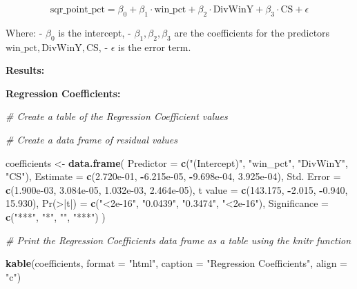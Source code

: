\documentclass[
]{article}
\newenvironment{Shaded}{\begin{snugshade}}{\end{snugshade}}
\newcommand{\AttributeTok}[1]{\textcolor[rgb]{0.13,0.29,0.53}{#1}}
\newcommand{\CommentTok}[1]{\textcolor[rgb]{0.56,0.35,0.01}{\textit{#1}}}
\newcommand{\FloatTok}[1]{\textcolor[rgb]{0.00,0.00,0.81}{#1}}
\newcommand{\FunctionTok}[1]{\textcolor[rgb]{0.13,0.29,0.53}{\textbf{#1}}}
\newcommand{\NormalTok}[1]{#1}
\newcommand{\OtherTok}[1]{\textcolor[rgb]{0.56,0.35,0.01}{#1}}
\newcommand{\SpecialCharTok}[1]{\textcolor[rgb]{0.81,0.36,0.00}{\textbf{#1}}}
\newcommand{\StringTok}[1]{\textcolor[rgb]{0.31,0.60,0.02}{#1}}
\begin{document}
\[
\text{sqr\_point\_pct} = \beta_0 + \beta_1 \cdot \text{win\_pct} + \beta_2 \cdot \text{DivWinY} + \beta_3 \cdot \text{CS} + \epsilon
\]

Where: - \(\beta_0\) is the intercept, - \(\beta_1, \beta_2, \beta_3\)
are the coefficients for the predictors
\(\text{win\_pct}, \text{DivWinY}, \text{CS}\), - \(\epsilon\) is the
error term.

\textbf{Results:}

\textbf{Regression Coefficients:}

\begin{Shaded}
\begin{Highlighting}[]
\CommentTok{\# Create a table of the Regression Coefficient values}

\CommentTok{\# Create a data frame of residual values}

\NormalTok{coefficients }\OtherTok{\textless{}{-}} \FunctionTok{data.frame}\NormalTok{(}
  \AttributeTok{Predictor =} \FunctionTok{c}\NormalTok{(}\StringTok{"(Intercept)"}\NormalTok{, }\StringTok{"win\_pct"}\NormalTok{, }\StringTok{"DivWinY"}\NormalTok{, }\StringTok{"CS"}\NormalTok{),}
  \AttributeTok{Estimate =} \FunctionTok{c}\NormalTok{(}\FloatTok{2.720e{-}01}\NormalTok{, }\SpecialCharTok{{-}}\FloatTok{6.215e{-}05}\NormalTok{, }\SpecialCharTok{{-}}\FloatTok{9.698e{-}04}\NormalTok{, }\FloatTok{3.925e{-}04}\NormalTok{),}
  \StringTok{\textasciigrave{}}\AttributeTok{Std. Error}\StringTok{\textasciigrave{}} \OtherTok{=} \FunctionTok{c}\NormalTok{(}\FloatTok{1.900e{-}03}\NormalTok{, }\FloatTok{3.084e{-}05}\NormalTok{, }\FloatTok{1.032e{-}03}\NormalTok{, }\FloatTok{2.464e{-}05}\NormalTok{),}
  \StringTok{\textasciigrave{}}\AttributeTok{t value}\StringTok{\textasciigrave{}} \OtherTok{=} \FunctionTok{c}\NormalTok{(}\FloatTok{143.175}\NormalTok{, }\SpecialCharTok{{-}}\FloatTok{2.015}\NormalTok{, }\SpecialCharTok{{-}}\FloatTok{0.940}\NormalTok{, }\FloatTok{15.930}\NormalTok{),}
  \StringTok{\textasciigrave{}}\AttributeTok{Pr(\textgreater{}|t|)}\StringTok{\textasciigrave{}} \OtherTok{=} \FunctionTok{c}\NormalTok{(}\StringTok{"\textless{}2e{-}16"}\NormalTok{, }\StringTok{"0.0439"}\NormalTok{, }\StringTok{"0.3474"}\NormalTok{, }\StringTok{"\textless{}2e{-}16"}\NormalTok{),}
  \AttributeTok{Significance =} \FunctionTok{c}\NormalTok{(}\StringTok{"***"}\NormalTok{, }\StringTok{"*"}\NormalTok{, }\StringTok{""}\NormalTok{, }\StringTok{"***"}\NormalTok{)}
\NormalTok{)}


\CommentTok{\# Print the Regression Coefficients data frame as a table using the knitr function}

\FunctionTok{kable}\NormalTok{(coefficients, }\AttributeTok{format =} \StringTok{"html"}\NormalTok{, }\AttributeTok{caption =} \StringTok{"Regression Coefficients"}\NormalTok{, }\AttributeTok{align =} \StringTok{"c"}\NormalTok{)}
\end{Highlighting}
\end{Shaded}
\end{document}
